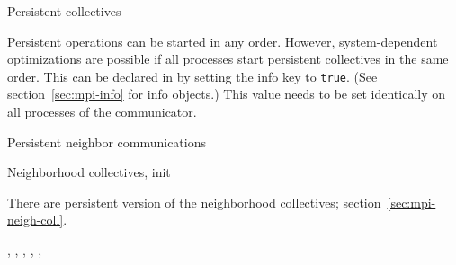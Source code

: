 \begin{mpifournote}{Persistent collectives}
\begin{remark}
  Persistent operations can be started in any order.
  However, system-dependent optimizations are possible
  if all processes start persistent collectives in the same order.
  This can be declared in  by setting the info key
  to \lstinline{true}.
  (See section~\ref{sec:mpi-info} for info objects.)
  This value needs to be set identically on all processes
  of the communicator.
\end{remark}

\end{mpifournote}

 {Persistent neighbor communications}

\begin{mpifournote}{Neighborhood collectives, init}

  There are persistent version of the neighborhood collectives;
  section~\ref{sec:mpi-neigh-coll}.

  \begin{raggedlist} %
    ,
    ,
    ,
    ,
    ,
  \end{raggedlist} %

\end{mpifournote}

